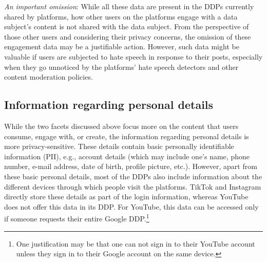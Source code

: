 \vspace{1 mm}
\noindent
\textit{An important omission}: While all these data are present in the DDPs currently shared by platforms, how other users on the platforms engage with a data subject's content is not shared with the data subject. 
From the perspective of those other users and considering their privacy concerns, the omission of these engagement data may be a justifiable action.
However, such data might be valuable if users are subjected to hate speech in response to their posts, especially when they go unnoticed by the platforms' hate speech detectors and other content moderation policies.
\fi



\subsection{Information regarding personal details}
\label{Sec: Personal}

While the two facets discussed above focus more on the content that users consume, engage with, or create, the information regarding personal details is more privacy-sensitive.
These details contain basic personally identifiable information (PII), e.g., account details (which may include one's name, phone number, e-mail address, date of birth, profile picture, etc.). 
However, apart from these basic personal details, most of the DDPs also include information about the different devices through which people visit the platforms.
TikTok and Instagram directly store these details as part of the login information, whereas YouTube does not offer this data in its DDP. 
For YouTube, this data can be accessed only if someone requests their entire Google DDP.\footnote{One justification may be that one can not sign in to their YouTube account unless they sign in to their Google account on the same device.}

